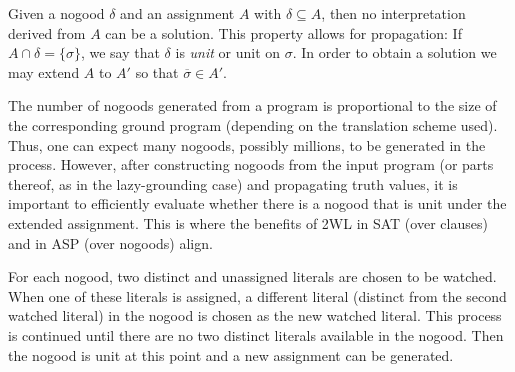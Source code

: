 \documentclass{vutinfth} %
\newcommand{\ass}{A}
\newcommand{\bsgl}{\sigma}
\begin{document}
Given a nogood $\delta$ and an assignment $\ass$ with $\delta \subseteq \ass$, then no interpretation derived from $\ass$ can be a solution. This property allows for propagation: If $\ass \cap \delta = \{ \bsgl \}$, we say that $\delta$ is \emph{unit} or unit on $\bsgl$. In order to obtain a solution we may extend $\ass$ to $\ass'$ so that $\overline{\bsgl} \in \ass'$.

The number of nogoods generated from a program is proportional to the size of the corresponding ground program (depending on the translation scheme used). Thus, one can expect many nogoods, possibly millions, to be generated in the process. However, after constructing nogoods from the input program (or parts thereof, as in the lazy-grounding case) and propagating truth values, it is important to efficiently evaluate whether there is a nogood that is unit under the extended assignment. This is where the benefits of 2WL in SAT (over clauses) and in ASP (over nogoods) align.

For each nogood, two distinct and unassigned literals are chosen to be watched. When one of these literals is assigned, a different literal (distinct from the second watched literal) in the nogood is chosen as the new watched literal. This process is continued until there are no two distinct literals available in the nogood. Then the nogood is unit at this point and a new assignment can be generated.
\end{document}

